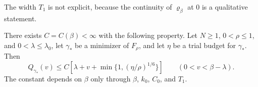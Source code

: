 The width $T_1$ is not explicit, because the continuity of $\varrho_\beta$ at
$0$ is a qualitative statement.

\begin{proposition}\label{prop:lz-quantile}
There exists $C=C(\beta)<\infty$ with the following property. Let $N\ge1$,
$0<\rho\le1$, and $0<\lambda\le\lambda_0$, let $\gamma_*$ be a minimizer
of $F_\rho$, and let $\eta$ be a trial budget for $\gamma_*$. Then
\begin{equation}\label{eq:lz-quantile}
 Q_{\gamma_*}(v)\le C\left[\lambda+v+\min\{1,(\eta/\rho)^{1/6}\}\right]
 \qquad(0<v<\beta-\lambda).
\end{equation}
The constant depends on $\beta$ only through $\beta$, $k_0$, $C_0$, and
$T_1$.
\end{proposition}

